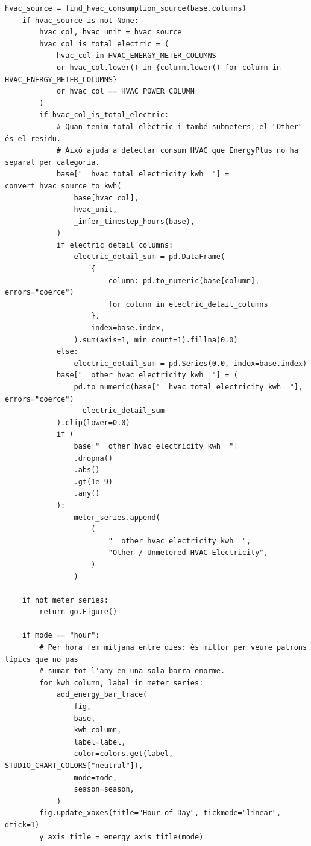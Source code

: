 \documentclass[10pt,a4paper]{article}
\begin{document}
\begin{lstlisting}[style=studioPython,caption={backend/grafics/hvac.py},label={lst:backend-grafics-hvac-py}]
    hvac_source = find_hvac_consumption_source(base.columns)
    if hvac_source is not None:
        hvac_col, hvac_unit = hvac_source
        hvac_col_is_total_electric = (
            hvac_col in HVAC_ENERGY_METER_COLUMNS
            or hvac_col.lower() in {column.lower() for column in HVAC_ENERGY_METER_COLUMNS}
            or hvac_col == HVAC_POWER_COLUMN
        )
        if hvac_col_is_total_electric:
            # Quan tenim total elèctric i també submeters, el "Other" és el residu.
            # Això ajuda a detectar consum HVAC que EnergyPlus no ha separat per categoria.
            base["__hvac_total_electricity_kwh__"] = convert_hvac_source_to_kwh(
                base[hvac_col],
                hvac_unit,
                _infer_timestep_hours(base),
            )
            if electric_detail_columns:
                electric_detail_sum = pd.DataFrame(
                    {
                        column: pd.to_numeric(base[column], errors="coerce")
                        for column in electric_detail_columns
                    },
                    index=base.index,
                ).sum(axis=1, min_count=1).fillna(0.0)
            else:
                electric_detail_sum = pd.Series(0.0, index=base.index)
            base["__other_hvac_electricity_kwh__"] = (
                pd.to_numeric(base["__hvac_total_electricity_kwh__"], errors="coerce")
                - electric_detail_sum
            ).clip(lower=0.0)
            if (
                base["__other_hvac_electricity_kwh__"]
                .dropna()
                .abs()
                .gt(1e-9)
                .any()
            ):
                meter_series.append(
                    (
                        "__other_hvac_electricity_kwh__",
                        "Other / Unmetered HVAC Electricity",
                    )
                )

    if not meter_series:
        return go.Figure()

    if mode == "hour":
        # Per hora fem mitjana entre dies: és millor per veure patrons típics que no pas
        # sumar tot l'any en una sola barra enorme.
        for kwh_column, label in meter_series:
            add_energy_bar_trace(
                fig,
                base,
                kwh_column,
                label=label,
                color=colors.get(label, STUDIO_CHART_COLORS["neutral"]),
                mode=mode,
                season=season,
            )
        fig.update_xaxes(title="Hour of Day", tickmode="linear", dtick=1)
        y_axis_title = energy_axis_title(mode)


\end{lstlisting}
\end{document}
